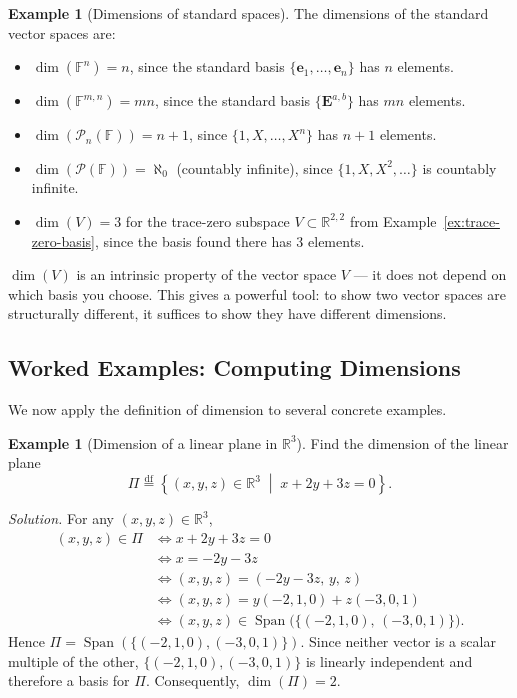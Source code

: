 \documentclass[11pt, a4paper, notitlepage]{report}
\theoremstyle{definition}
\newtheorem{example}[theorem]{Example}
\theoremstyle{remark}
\begin{document}
\begin{example}[Dimensions of standard spaces]\label{ex:dimensions}
The dimensions of the standard vector spaces are:
\begin{itemize}
  \item $\dim(\mathbb{F}^n) = n$, since the standard basis $\{\mathbf{e}_1, \ldots, \mathbf{e}_n\}$ has $n$ elements.
  \item $\dim(\mathbb{F}^{m,n}) = mn$, since the standard basis $\{\mathbf{E}^{a,b}\}$ has $mn$ elements.
  \item $\dim(\mathscr{P}_n(\mathbb{F})) = n+1$, since $\{1, X, \ldots, X^n\}$ has $n+1$ elements.
  \item $\dim(\mathscr{P}(\mathbb{F})) = \aleph_0$ (countably infinite), since $\{1, X, X^2, \ldots\}$ is countably infinite.
  \item $\dim(V) = 3$ for the trace-zero subspace $V \subset \mathbb{R}^{2,2}$ from Example~\ref{ex:trace-zero-basis}, since the basis found there has 3 elements.
\end{itemize}
\end{example}

\begin{keyresult}[title={Key Result: Dimension as a Basis-Independent Invariant}]
$\dim(V)$ is an intrinsic property of the vector space $V$ — it does not depend on which basis you choose. This gives a powerful tool: to show two vector spaces are structurally different, it suffices to show they have different dimensions.
\end{keyresult}

\subsection{Worked Examples: Computing Dimensions}

We now apply the definition of dimension to several concrete examples.

\begin{example}[Dimension of a linear plane in $\mathbb{R}^3$]\label{ex:dim-plane-R3}
Find the dimension of the linear plane
\[
  \Pi \stackrel{\mathrm{df}}{=} \left\{(x,y,z)\in\mathbb{R}^3 \;\middle|\; x + 2y + 3z = 0\right\}.
\]

\emph{Solution.} For any $(x,y,z)\in\mathbb{R}^3$,
\begin{align*}
  (x,y,z)\in\Pi &\iff x + 2y + 3z = 0 \\
                 &\iff x = -2y - 3z \\
                 &\iff (x,y,z) = (-2y-3z,\, y,\, z) \\
                 &\iff (x,y,z) = y(-2,1,0) + z(-3,0,1) \\
                 &\iff (x,y,z) \in \operatorname{Span}\bigl(\{(-2,1,0),\,(-3,0,1)\}\bigr).
\end{align*}
Hence $\Pi = \operatorname{Span}(\{(-2,1,0),(-3,0,1)\})$. Since neither vector is a scalar multiple of the other, $\{(-2,1,0),(-3,0,1)\}$ is linearly independent and therefore a basis for $\Pi$. Consequently, $\dim(\Pi) = 2$.
\end{example}
\end{document}
